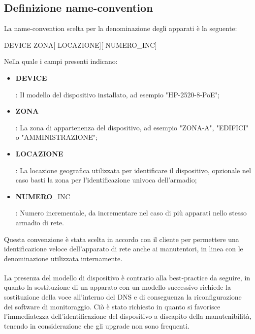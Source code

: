 \documentclass[Realizzazione.tex]{subfiles}
\begin{document}
\subsection{Definizione name-convention}
La name-convention scelta per la denominazione degli apparati è la seguente:\\
{ \centering
	\begin{ttfamily}
		\large DEVICE-ZONA[-LOCAZIONE][-NUMERO\_INC]\\
	\end{ttfamily}
}
\medskip
Nella quale i campi presenti indicano: 
\begin{itemize}
	\item  \begin{ttfamily}\textbf{DEVICE}\end{ttfamily}: Il modello del dispositivo installato, ad esempio "HP-2520-8-PoE";
	\item  \begin{ttfamily}\textbf{ZONA}\end{ttfamily}: La zona di appartenenza del dispositivo, ad esempio "ZONA-A", "EDIFICI" o "AMMINISTRAZIONE";
	\item  \begin{ttfamily}\textbf{LOCAZIONE}\end{ttfamily}: La locazione geografica utilizzata per identificare il dispositivo, opzionale nel caso basti la zona per l'identificazione univoca dell'armadio;
	\item  \begin{ttfamily}\textbf{NUMERO}\_INC\end{ttfamily}: Numero incrementale, da incrementare nel caso di più apparati nello stesso armadio di rete.
\end{itemize}

Questa convenzione è stata scelta in accordo con il cliente per permettere una identificazione veloce dell'apparato di rete anche ai manutentori, in linea con le denominazione utilizzata internamente. \\\\
La presenza del modello di dispositivo è contrario alla best-practice da seguire, in quanto la sostituzione di un apparato con un modello successivo richiede la sostituzione della voce all'interno del DNS e di conseguenza la riconfigurazione dei software di monitoraggio. Ciò è stato richiesto in quanto si favorisce l'immediatezza dell'identificazione del dispositivo a discapito della manutenibilità, tenendo in considerazione che gli upgrade non sono frequenti. \\
\end{document}
